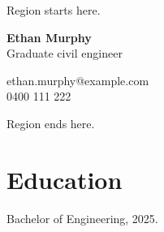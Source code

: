 \documentclass[10pt,a4paper]{article}
\begin{document}
Region starts here.

\noindent
\begin{minipage}[t]{0.6\linewidth}
{\Large\bfseries Ethan Murphy}\\
Graduate civil engineer
\end{minipage}\hfill
\begin{minipage}[t]{0.38\linewidth}
\raggedleft
ethan.murphy@example.com\\
0400 111 222
\end{minipage}

Region ends here.

\section{Education}
Bachelor of Engineering, 2025.
\end{document}
